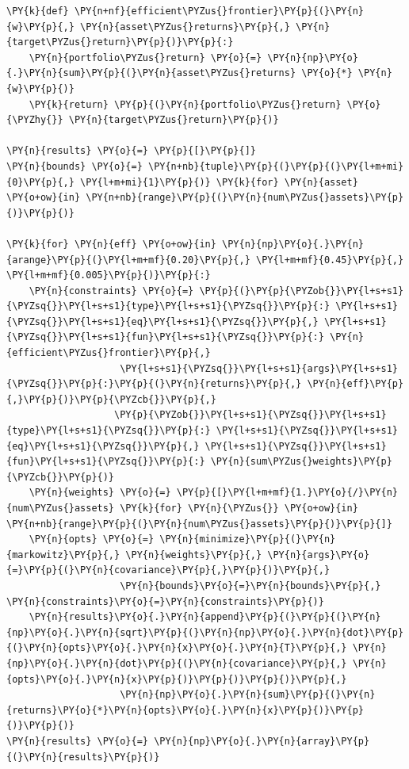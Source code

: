 \begin{tcolorbox}[breakable, size=fbox, boxrule=1pt, pad at break*=1mm,colback=cellbackground, colframe=cellborder]
\begin{Verbatim}[commandchars=\\\{\}]
\PY{k}{def} \PY{n+nf}{efficient\PYZus{}frontier}\PY{p}{(}\PY{n}{w}\PY{p}{,} \PY{n}{asset\PYZus{}returns}\PY{p}{,} \PY{n}{target\PYZus{}return}\PY{p}{)}\PY{p}{:} 
    \PY{n}{portfolio\PYZus{}return} \PY{o}{=} \PY{n}{np}\PY{o}{.}\PY{n}{sum}\PY{p}{(}\PY{n}{asset\PYZus{}returns} \PY{o}{*} \PY{n}{w}\PY{p}{)} 
    \PY{k}{return} \PY{p}{(}\PY{n}{portfolio\PYZus{}return} \PY{o}{\PYZhy{}} \PY{n}{target\PYZus{}return}\PY{p}{)}
		
\PY{n}{results} \PY{o}{=} \PY{p}{[}\PY{p}{]}
\PY{n}{bounds} \PY{o}{=} \PY{n+nb}{tuple}\PY{p}{(}\PY{p}{(}\PY{l+m+mi}{0}\PY{p}{,} \PY{l+m+mi}{1}\PY{p}{)} \PY{k}{for} \PY{n}{asset} \PY{o+ow}{in} \PY{n+nb}{range}\PY{p}{(}\PY{n}{num\PYZus{}assets}\PY{p}{)}\PY{p}{)}
		
\PY{k}{for} \PY{n}{eff} \PY{o+ow}{in} \PY{n}{np}\PY{o}{.}\PY{n}{arange}\PY{p}{(}\PY{l+m+mf}{0.20}\PY{p}{,} \PY{l+m+mf}{0.45}\PY{p}{,} \PY{l+m+mf}{0.005}\PY{p}{)}\PY{p}{:}
    \PY{n}{constraints} \PY{o}{=} \PY{p}{(}\PY{p}{\PYZob{}}\PY{l+s+s1}{\PYZsq{}}\PY{l+s+s1}{type}\PY{l+s+s1}{\PYZsq{}}\PY{p}{:} \PY{l+s+s1}{\PYZsq{}}\PY{l+s+s1}{eq}\PY{l+s+s1}{\PYZsq{}}\PY{p}{,} \PY{l+s+s1}{\PYZsq{}}\PY{l+s+s1}{fun}\PY{l+s+s1}{\PYZsq{}}\PY{p}{:} \PY{n}{efficient\PYZus{}frontier}\PY{p}{,} 
                    \PY{l+s+s1}{\PYZsq{}}\PY{l+s+s1}{args}\PY{l+s+s1}{\PYZsq{}}\PY{p}{:}\PY{p}{(}\PY{n}{returns}\PY{p}{,} \PY{n}{eff}\PY{p}{,}\PY{p}{)}\PY{p}{\PYZcb{}}\PY{p}{,}
                   \PY{p}{\PYZob{}}\PY{l+s+s1}{\PYZsq{}}\PY{l+s+s1}{type}\PY{l+s+s1}{\PYZsq{}}\PY{p}{:} \PY{l+s+s1}{\PYZsq{}}\PY{l+s+s1}{eq}\PY{l+s+s1}{\PYZsq{}}\PY{p}{,} \PY{l+s+s1}{\PYZsq{}}\PY{l+s+s1}{fun}\PY{l+s+s1}{\PYZsq{}}\PY{p}{:} \PY{n}{sum\PYZus{}weights}\PY{p}{\PYZcb{}}\PY{p}{)}
    \PY{n}{weights} \PY{o}{=} \PY{p}{[}\PY{l+m+mf}{1.}\PY{o}{/}\PY{n}{num\PYZus{}assets} \PY{k}{for} \PY{n}{\PYZus{}} \PY{o+ow}{in} \PY{n+nb}{range}\PY{p}{(}\PY{n}{num\PYZus{}assets}\PY{p}{)}\PY{p}{]}
    \PY{n}{opts} \PY{o}{=} \PY{n}{minimize}\PY{p}{(}\PY{n}{markowitz}\PY{p}{,} \PY{n}{weights}\PY{p}{,} \PY{n}{args}\PY{o}{=}\PY{p}{(}\PY{n}{covariance}\PY{p}{,}\PY{p}{)}\PY{p}{,}
                    \PY{n}{bounds}\PY{o}{=}\PY{n}{bounds}\PY{p}{,} \PY{n}{constraints}\PY{o}{=}\PY{n}{constraints}\PY{p}{)} 	
    \PY{n}{results}\PY{o}{.}\PY{n}{append}\PY{p}{(}\PY{p}{(}\PY{n}{np}\PY{o}{.}\PY{n}{sqrt}\PY{p}{(}\PY{n}{np}\PY{o}{.}\PY{n}{dot}\PY{p}{(}\PY{n}{opts}\PY{o}{.}\PY{n}{x}\PY{o}{.}\PY{n}{T}\PY{p}{,} \PY{n}{np}\PY{o}{.}\PY{n}{dot}\PY{p}{(}\PY{n}{covariance}\PY{p}{,} \PY{n}{opts}\PY{o}{.}\PY{n}{x}\PY{p}{)}\PY{p}{)}\PY{p}{)}\PY{p}{,}
                    \PY{n}{np}\PY{o}{.}\PY{n}{sum}\PY{p}{(}\PY{n}{returns}\PY{o}{*}\PY{n}{opts}\PY{o}{.}\PY{n}{x}\PY{p}{)}\PY{p}{)}\PY{p}{)} 
\PY{n}{results} \PY{o}{=} \PY{n}{np}\PY{o}{.}\PY{n}{array}\PY{p}{(}\PY{n}{results}\PY{p}{)}
\end{Verbatim}
\end{tcolorbox}

